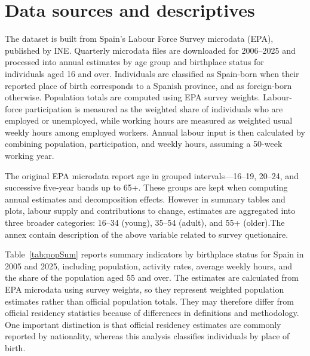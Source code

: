 \section{Data sources and descriptives}

The dataset is built from Spain's Labour Force Survey microdata (EPA), published by INE. Quarterly microdata files are downloaded for 2006--2025 and processed into annual estimates by age group and birthplace status for individuals aged 16 and over. Individuals are classified as Spain-born when their reported place of birth corresponds to a Spanish province, and as foreign-born otherwise. Population totals are computed using EPA survey weights. Labour-force participation is measured as the weighted share of individuals who are employed or unemployed, while working hours are measured as weighted usual weekly hours among employed workers. Annual labour input is then calculated by combining population, participation, and weekly hours, assuming a 50-week working year.

\vspace{0.7em}\par
The original EPA microdata report age in grouped intervals—16--19, 20--24, and successive five‑year bands up to 65+. These groups are kept when computing annual estimates and decomposition effects. However in summary tables and plots, labour supply and contributions to change, estimates are aggregated into three broader categories: 16--34 (young), 35--54 (adult), and 55+ (older).The annex contain description of the above variable related to survey quetionaire.


\vspace{0.7em}\par
Table~\ref{tab:popSum} reports summary indicators by birthplace status for Spain in 2005 and 2025, including population, activity rates, average weekly hours, and the share of the population aged 55 and over. The estimates are calculated from EPA microdata using survey weights, so they represent weighted population estimates rather than official population totals. They may therefore differ from official residency statistics because of differences in definitions and methodology. One important distinction is that official residency estimates are commonly reported by nationality, whereas this analysis classifies individuals by place of birth.

\begin{table}[H]%
  \caption{Population aged 16 and over, activity, hours, and ageing indicators by birthplace, Spain, 2005 and 2025.}

  \label{tab:popSum}%
  \begin{center}
    \caption*{\small Note: Population is in millions; activity rate and the share aged 55+ are percentages; weekly hours are average hours worked per week; Combined ativity rate and weekly hours are computed as population‑weighted means of the age‑group measures.}
  \end{center}
\end{table}%

